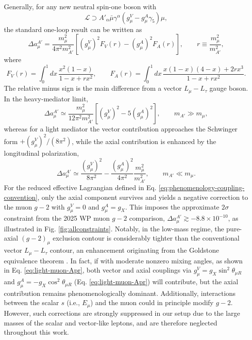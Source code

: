 \documentclass[onecolumn, aps, nofootinbib, prd, preprint, floats, floatfix, amsmath, amssymb, superscriptaddress, preprintnumbers]{revtex4-1}
\begin{document}
Generally, for any new neutral spin-one boson with
\begin{equation}
\mathcal L\supset
A'_\alpha\bar\mu\gamma^\alpha
\left(g_\mu^V-g_\mu^A\gamma_5\right)\mu ,
\end{equation}
the standard one-loop result can be written as \cite{Leveille:1977rc,Davoudiasl:2014kua,Anastasopoulos:2022ywj}
\begin{equation}
\Delta a_\mu^{A'}=
\frac{m_\mu^2}{4\pi^2m_{A'}^2}
\left[
(g_\mu^V)^2F_V(r)
-(g_\mu^A)^2F_A(r)
\right],
\qquad
r\equiv \frac{m_\mu^2}{m_{A'}^2},
\label{eq:gminus2-vector-axial}
\end{equation}
where
\begin{equation}
F_V(r)=\int_0^1 dx\,
\frac{x^2(1-x)}{1-x+r x^2},
\qquad
F_A(r)=\int_0^1 dx\,
\frac{x(1-x)(4-x)+2r x^3}{1-x+r x^2}.
\label{eq:gminus2-FV-FA}
\end{equation}
The relative minus sign is the main difference from a vector $L_\mu-L_\tau$ gauge boson. In the heavy-mediator limit,
\begin{equation}
\Delta a_\mu^{A'}\simeq
\frac{m_\mu^2}{12\pi^2m_{A'}^2}
\left[(g_\mu^V)^2-5(g_\mu^A)^2\right],
\qquad m_{A'}\gg m_\mu ,
\label{eq:gminus2-heavy-limit}
\end{equation}
whereas for a light mediator the vector contribution approaches the Schwinger form $+(g_\mu^V)^2/(8\pi^2)$, while the axial contribution is enhanced by the longitudinal polarization,
\begin{equation}
\Delta a_\mu^{A'}\simeq
\frac{(g_\mu^V)^2}{8\pi^2}
-\frac{(g_\mu^A)^2}{4\pi^2}\frac{m_\mu^2}{m_{A'}^2},
\qquad m_{A'}\ll m_\mu .
\label{eq:gminus2-light-limit}
\end{equation}
For the reduced effective Lagrangian defined in Eq. \eqref{eq:phenomenology-coupling-convention}, only the axial component survives and yields a negative correction to the muon $g-2$ with $g_\mu^V=0$ and $g_\mu^A=g_X$. This imposes the approximate $2\sigma$ constraint from the 2025 WP muon $g-2$ comparison, $\Delta a_\mu^{A'} \gtrsim -8.8\times10^{-10}$, as illustrated in Fig. \ref{fig:allconstraints}.
Notably, in the low-mass regime, the pure-axial $(g-2)_\mu$ exclusion contour is considerably tighter than the conventional vector $L_\mu-L_\tau$ contour, an enhancement originating from the Goldstone equivalence theorem \cite{Fayet:2020nyx,Dror:2017nsg,Biggio:2016wyy}. 
In fact, if with moderate nonzero mixing angles, as shown in Eq. \eqref{eq:light-muon-Apr}, both vector and axial couplings via $g_\mu^V=g_X \sin^2\theta_{\mu R}$ and $g_\mu^A=-g_X \cos^2\theta_{\mu R}$ (Eq. \eqref{eq:light-muon-Apr}) will contribute, but the axial contribution remains phenomenologically dominant.
Additionally, interactions between the scalar $s$ (i.e., $E_\mu$) and the muon could in principle modify $g-2$. However, such corrections are strongly suppressed in our setup due to the large masses of the scalar and vector-like leptons, and are therefore neglected throughout this work.
\end{document}

